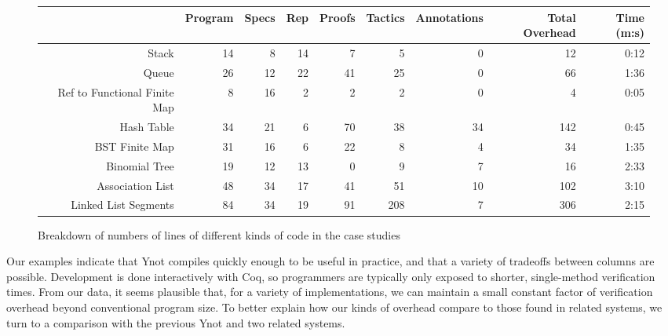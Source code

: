 \documentclass[preprint,nocopyrightspace]{sigplanconf}
\begin{document}
{\begin{figure*}
  \begin{center}
    \begin{tabular}{r | r | r | r | r | r | r | r | r}
                                             & Program & Specs & Rep & Proofs & Tactics &  Annotations    & Total Overhead & Time (m:s) \\ \hline
Stack                                        &   14    &  8    &  14 &  7     &    5    &      0          &    12       & 0:12 \\
Queue                                        &   26    &  12   &  22 &  41    &    25   &      0          &    66       & 1:36 \\
Ref to Functional Finite Map                 &    8    &  16   &   2 &   2    &     2   &     0           &     4       & 0:05 \\
Hash Table                                   &   34    &  21   &  6  &  70    &   38    &     34          &   142       & 0:45 \\
BST Finite Map                               &   31    &  16   &  6  &  22    &    8    &      4          &    34       & 1:35 \\
Binomial Tree                                &   19    &  12   &  13 &   0    &    9    &      7          &    16       & 2:33 \\
Association List                             &   48    &  34   &  17 &  41    &   51    &     10          &   102       & 3:10 \\
Linked List Segments                         &   84    &  34   &  19 &  91   &   208   &       7         &    306      &  2:15 \\
    \end{tabular}
  \end{center}
\footnotesize
\normalsize
  \caption{\label{loc}Breakdown of numbers of lines of different kinds of code in the case studies}
\end{figure*}

Our examples indicate that Ynot compiles quickly enough to be useful in practice, and that a variety of tradeoffs between columns are possible.  Development is done interactively with Coq, so programmers are typically only exposed to shorter, single-method verification times.  From our data, it seems plausible that, for a variety of implementations, we can maintain a small constant factor of verification overhead beyond conventional program size.  To better explain how our kinds of overhead compare to those found in related systems, we turn to a comparison with the previous Ynot and two related systems.

}
\end{document}

